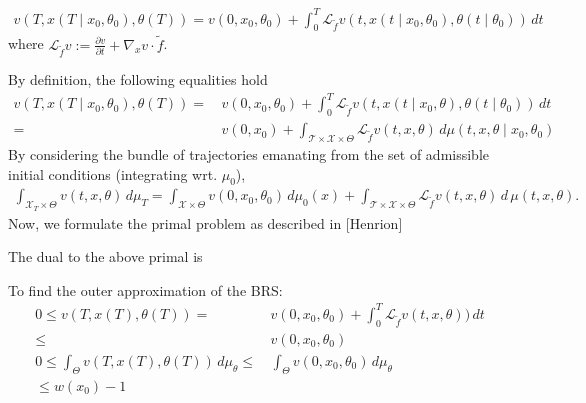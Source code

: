 \documentclass[10pt]{scrartcl}
\theoremstyle{remark}
\providecommand{\ip}[1]{\ensuremath \langle #1\rangle}
\begin{document}
\begin{align}
	v(T,x(T\mid x_0,\theta_0),\theta(T))=v(0,x_0,\theta_0)+\int_{0}^T \mathcal L_{\tilde f}v(t,x(t\mid x_0,\theta_0),\theta(t\mid \theta_0))\,dt
\end{align}
where $\mathcal L_{\tilde f}v:=\frac{\partial v}{\partial t}+\nabla_x v \cdot \tilde f$.
\par
 By definition, the following equalities hold
\begin{align}
	v(T,x(T\mid x_0,\theta_0),\theta(T))=&\,v(0,x_0,\theta_0)+\int_{0}^T \mathcal L_{\tilde f}v(t,x(t\mid x_0,\theta),\theta(t\mid\theta_0))\,dt\\
	=&\,v(0,x_0)+\int_{\mathcal T\times \mathcal X\times \Theta}\mathcal L_{\tilde f}v(t,x,\theta)\,d\mu(t,x,\theta\mid x_0,\theta_0)
\end{align}
By considering the bundle of trajectories emanating from the set of admissible initial conditions (integrating wrt. $\mu_0$),
\begin{align}
	\int_{\mathcal X_T\times \Theta} v(t,x,\theta) \,d\mu_T=\int_{\mathcal X\times \Theta}v(0,x_0,\theta_0)\,d\mu_0(x)+\int_{\mathcal T\times \mathcal X\times \Theta} \mathcal L_{\tilde f}v(t,x,\theta)\,d\,\mu(t,x,\theta).
\end{align}
Now, we formulate the primal problem as described in [Henrion]
The dual to the above primal is
To find the outer approximation of the BRS:
\begin{align}
0\le v(T,x(T),\theta(T))=&\,v(0,x_0,\theta_0)+\int_{0}^T\mathcal L_{\tilde f}v(t,x,\theta))\,dt\\
\le &\,v(0,x_0,\theta_0)\\
0\le \int_{\Theta}v(T,x(T),\theta(T))\,d\mu_\theta\le &\,\int_{\Theta}v(0,x_0,\theta_0)\,d\mu_\theta\\
\le w(x_0)-1
\end{align}
\newpage
\end{document}
